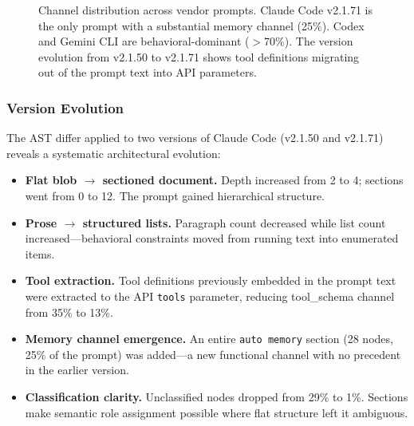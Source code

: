 \documentclass[11pt,a4paper]{article}
\begin{document}
\begin{figure}[H]
\centering
{}
\caption{Channel distribution across vendor prompts. Claude Code v2.1.71
  is the only prompt with a substantial memory channel (25\%). Codex and
  Gemini CLI are behavioral-dominant ($>$70\%). The version evolution from
  v2.1.50 to v2.1.71 shows tool definitions migrating out of the prompt
  text into API parameters.}
\label{fig:channels}
\end{figure}


\subsubsection{Version Evolution}

The AST differ applied to two versions of Claude Code (v2.1.50 and
v2.1.71) reveals a systematic architectural evolution:

\begin{itemize}[leftmargin=*]
  \item \textbf{Flat blob $\to$ sectioned document.} Depth increased
    from 2 to 4; sections went from 0 to 12. The prompt gained
    hierarchical structure.
  \item \textbf{Prose $\to$ structured lists.} Paragraph count
    decreased while list count increased---behavioral constraints moved
    from running text into enumerated items.
  \item \textbf{Tool extraction.} Tool definitions previously embedded
    in the prompt text were extracted to the API \texttt{tools}
    parameter, reducing tool\_schema channel from 35\% to 13\%.
  \item \textbf{Memory channel emergence.} An entire \texttt{auto
    memory} section (28 nodes, 25\% of the prompt) was added---a new
    functional channel with no precedent in the earlier version.
  \item \textbf{Classification clarity.} Unclassified nodes dropped
    from 29\% to 1\%. Sections make semantic role assignment possible
    where flat structure left it ambiguous.
\end{itemize}
\end{document}
